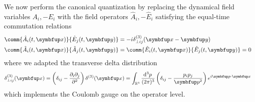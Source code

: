 We now perform the canonical quantization by replacing the dynamical field variables $A_i,-E_i$ with the field operators $\hat{A}_i,-\hat{E}_i$ satisfying the equal-time commutation relations~\cite[p.~197]{Greiner2013}
\begin{align}
	\comm{\hat{A}_i(t,\vb{x})}{\hat{E}_j(t,\vb{y})}
	&=
	-i
	\delta^{(3)}_{\perp ij}(\vb{x}-\vb{y})
	\label{eq:equal_time_commutation_relation_nonzero}
	\\
	\comm{\hat{A}_i(t,\vb{x})}{\hat{A}_j(t,\vb{y})}
	&=
	\comm{\hat{E}_i(t,\vb{x})}{\hat{E}_j(t,\vb{y})}
	=
	0
	\label{eq:equal_time_commutation_relation_zero}
\end{align}
where we adapted the transverse delta distribution~\cite[p.~198]{Greiner2013}
\begin{equation}
	\delta^{(3)}_{\perp ij}(\vb{x})
	=
	\left(
		\delta_{ij}
		-
		\frac{\partial_i\partial_j}{\partial^2}
	\right)
	\delta^{(3)}(\vb{x})
	=
	\int_{\mathbb{R}^3}\frac{\dd[3]{p}}{(2\pi)^3}
	\left(
		\delta_{ij}
		-
		\frac{p_ip_j}{\vb{p}^2}
	\right)
	e^{i\vb{p}\vdot\vb{x}}
	\label{eq:transverse_delta_distribution}
\end{equation}
which implements the Coulomb gauge on the operator level.

